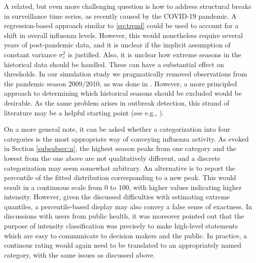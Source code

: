 \documentclass[12pt]{article}
\begin{document}
A related, but even more challenging question is how to address structural breaks in surveillance time series, as recently caused by the COVID-19 pandemic. A regression-based approach similar to \eqref{eq:trend} could be used to account for a shift in overall influenza levels. However, this would nonetheless require several years of post-pandemic data, and it is unclear if the implicit assumption of constant variance $\sigma^2_\varepsilon$ is justified. Also, it is unclear how extreme seasons in the historical data should be handled. These can have a substantial effect on thresholds. In our simulation study we pragmatically removed observations from the pandemic season 2009/2010, as was done in \cite{Vega2015}. However, a more principled approach to determining which historical seasons should be excluded would be desirable. As the same problem arises in outbreak detection, this strand of literature may be a helpful starting point (see e.g., \citealt{Noufaily2013}).


On a more general note, it can be asked whether a categorization into four categories is the most appropriate way of conveying influenza activity. As evoked in Section \ref{subsubsec:n}, the highest season peaks from one category and the lowest from the one above are not qualitatively different, and a discrete categorization may seem somewhat arbitrary. An alternative is to report the percentile of the fitted distribution corresponding to a new peak. This would result in a continuous scale from 0 to 100, with higher values indicating higher intensity. However, given the discussed difficulties with estimating extreme quantiles, a percentile-based display may also convey a false sense of exactness. In discussions with users from public health, it was moreover pointed out that the purpose of intensity classification was precisely to make high-level statements which are easy to communicate to decision makers and the public. In practice, a continous rating would again need to be translated to an appropriately named category, with the same issues as discussed above.

\end{document}
